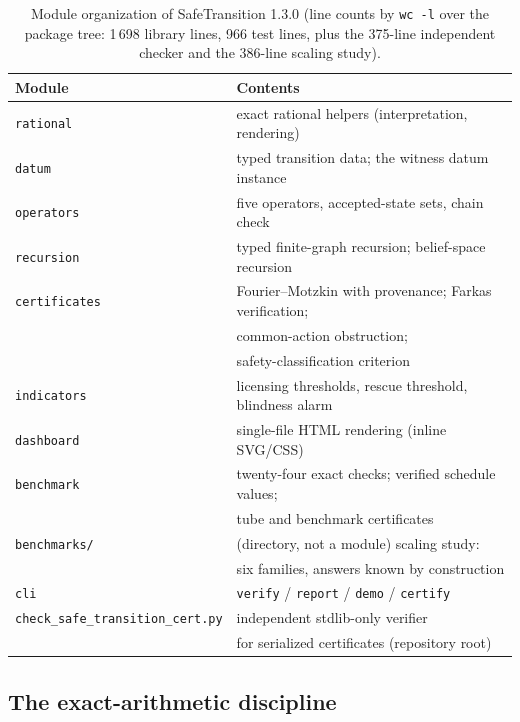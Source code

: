 \documentclass[3p,11pt]{elsarticle}
\begin{document}
\begin{table}[t]
\centering
\small
\begin{tabular}{@{}ll@{}}
\toprule
Module & Contents \\
\midrule
\texttt{rational} & exact rational helpers (interpretation, rendering) \\
\texttt{datum} & typed transition data; the witness datum instance \\
\texttt{operators} & five operators, accepted-state sets, chain check \\
\texttt{recursion} & typed finite-graph recursion; belief-space recursion \\
\texttt{certificates} & Fourier--Motzkin with provenance; Farkas verification; \\
                       & common-action obstruction; \\
                       & safety-classification criterion \\
\texttt{indicators} & licensing thresholds, rescue threshold, blindness alarm \\
\texttt{dashboard} & single-file HTML rendering (inline SVG/CSS) \\
\texttt{benchmark} & twenty-four exact checks; verified schedule values; \\
                       & tube and benchmark certificates \\
\texttt{benchmarks/} & (directory, not a module) scaling study: \\
                       & six families, answers known by construction \\
\texttt{cli} & \texttt{verify} / \texttt{report} / \texttt{demo} / \texttt{certify} \\
\texttt{check\_safe\_transition\_cert.py} & independent stdlib-only verifier \\
                       & for serialized certificates (repository root) \\
\bottomrule
\end{tabular}
\caption{Module organization of SafeTransition 1.3.0 (line counts by
\texttt{wc~-l} over the package tree: 1\,698 library lines, 966 test
lines, plus the 375-line independent checker and the 386-line scaling
study).}
\label{tab:modules}
\end{table}

\subsection{The exact-arithmetic discipline}\label{sec:exactness}
\end{document}
